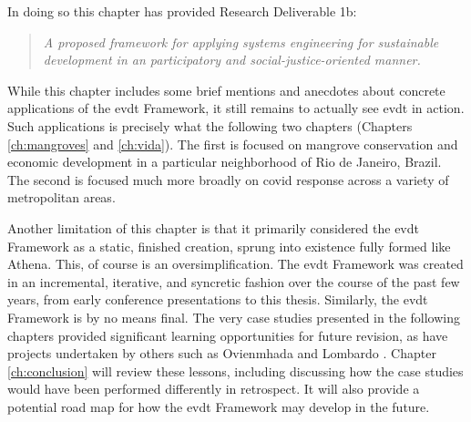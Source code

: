 In doing so this chapter has provided Research Deliverable 1b:

\blockquote{\textit{A proposed framework for applying systems engineering for sustainable development in an participatory and social-justice-oriented manner.}}

While this chapter includes some brief mentions and anecdotes about concrete applications of the \ac{evdt} Framework, it still remains to actually see \ac{evdt} in action. Such applications is precisely what the following two chapters (Chapters \ref{ch:mangroves} and \ref{ch:vida}). The first is focused on mangrove conservation and economic development in a particular neighborhood of Rio de Janeiro, Brazil. The second is focused much more broadly on \ac{covid} response across a variety of metropolitan areas.

Another limitation of this chapter is that it primarily considered the \ac{evdt} Framework as a static, finished creation, sprung into existence fully formed like Athena. This, of course is an oversimplification. The \ac{evdt} Framework was created in an incremental, iterative, and syncretic fashion over the course of the past few years, from early conference presentations \cite{reidCombiningSocialEnvironmental2019} to this thesis. Similarly, the \ac{evdt} Framework is by no means final. The very case studies presented in the following chapters provided significant learning opportunities for future revision, as have projects undertaken by others such as Ovienmhada \cite{ovienmhadaEnvironmentVulnerabilityDecisionTechnologyModelingFramework2021, ovienmhadaEarthObservationTechnology2020} and Lombardo \cite{lombardoEnvironmentVulnerabilityDecisionTechnologyFrameworkDecision2022}. Chapter \ref{ch:conclusion} will review these lessons, including discussing how the case studies would have been performed differently in retrospect. It will also provide a potential road map for how the \ac{evdt} Framework may develop in the future.
